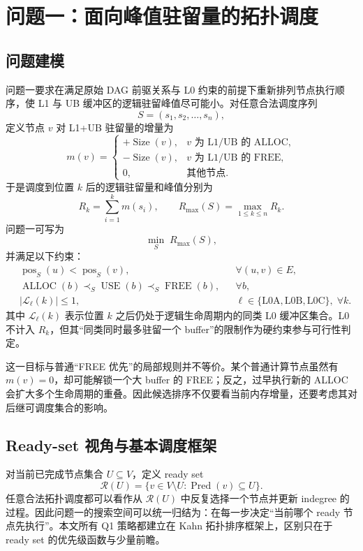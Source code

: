 \section{问题一：面向峰值驻留量的拓扑调度}

\subsection{问题建模}

问题一要求在满足原始 DAG 前驱关系与 L0 约束的前提下重新排列节点执行顺序，使 L1 与 UB 缓冲区的逻辑驻留峰值尽可能小。对任意合法调度序列
\[
S=(s_1,s_2,\ldots,s_n),
\]
定义节点 $v$ 对 L1+UB 驻留量的增量为
\[
m(v)=
\begin{cases}
+\operatorname{Size}(v), & v\text{ 为 L1/UB 的 ALLOC},\\
-\operatorname{Size}(v), & v\text{ 为 L1/UB 的 FREE},\\
0, & \text{其他节点}.
\end{cases}
\]
于是调度到位置 $k$ 后的逻辑驻留量和峰值分别为
\[
R_k=\sum_{i=1}^{k}m(s_i),\qquad
R_{\max}(S)=\max_{1\le k\le n}R_k .
\]
问题一可写为
\[
\min_{S}\;R_{\max}(S),
\]
并满足以下约束：
\begin{align}
&\operatorname{pos}_S(u)<\operatorname{pos}_S(v), && \forall (u,v)\in E,\\
&\operatorname{ALLOC}(b)\prec_S\operatorname{USE}(b)\prec_S\operatorname{FREE}(b), && \forall b,\\
&|\mathcal L_{\ell}(k)|\le 1, && \ell\in\{\mathrm{L0A,L0B,L0C}\},\;\forall k.
\end{align}
其中 $\mathcal L_{\ell}(k)$ 表示位置 $k$ 之后仍处于逻辑生命周期内的同类 L0 缓冲区集合。L0 不计入 $R_k$，但其“同类同时最多驻留一个 buffer”的限制作为硬约束参与可行性判定。

这一目标与普通“FREE 优先”的局部规则并不等价。某个普通计算节点虽然有 $m(v)=0$，却可能解锁一个大 buffer 的 FREE；反之，过早执行新的 ALLOC 会扩大多个生命周期的重叠。因此候选排序不仅要看当前内存增量，还要考虑其对后继可调度集合的影响。

\subsection{Ready-set 视角与基本调度框架}

对当前已完成节点集合 $U\subseteq V$，定义 ready set
\[
\mathcal R(U)=\{v\in V\setminus U:\operatorname{Pred}(v)\subseteq U\}.
\]
任意合法拓扑调度都可以看作从 $\mathcal R(U)$ 中反复选择一个节点并更新 indegree 的过程。因此问题一的搜索空间可以统一归结为：在每一步决定“当前哪个 ready 节点先执行”。本文所有 Q1 策略都建立在 Kahn 拓扑排序框架上，区别只在于 ready set 的优先级函数与少量前瞻。

